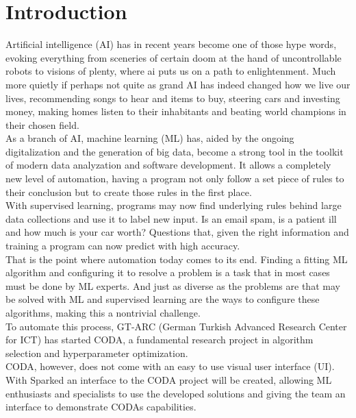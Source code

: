 \chapter{Introduction}

Artificial intelligence (AI) has in recent years become one of those hype words, evoking everything from sceneries of certain doom at the hand of uncontrollable robots to visions of plenty, where ai puts us on a path to enlightenment. Much more quietly if perhaps not quite as grand AI has indeed changed how we live our lives, recommending songs to hear and items to buy, steering cars and investing money, making homes listen to their inhabitants and beating world champions in their chosen field.\\
As a branch of AI, machine learning (ML) has, aided by the ongoing digitalization and the generation of big data, become a strong tool in the toolkit of modern data analyzation and software development. It allows a completely new level of automation, having a program not only follow a set piece of rules to their conclusion but to create those rules in the first place. \\
With supervised learning, programs may now find underlying rules behind large data collections and use it to label new input. Is an email spam, is a patient ill and how much is your car worth? Questions that, given the right information and training a program can now predict with high accuracy.\\
That is the point where automation today comes to its end. Finding a fitting ML algorithm and configuring it to resolve a problem is a task that in most cases must be done by ML experts. And just as diverse as the problems are that may be solved with ML and supervised learning are the ways to configure these algorithms, making this a nontrivial challenge. \\
To automate this process, GT-ARC (German Turkish Advanced Research Center for ICT) has started CODA, a fundamental research project in algorithm selection and hyperparameter optimization. \cite{gt-arc}  \\
CODA, however, does not come with an easy to use visual user interface (UI). With Sparked an interface to the CODA project will be created, allowing ML enthusiasts and specialists to use the developed solutions and giving the team an interface to demonstrate CODAs capabilities. 
